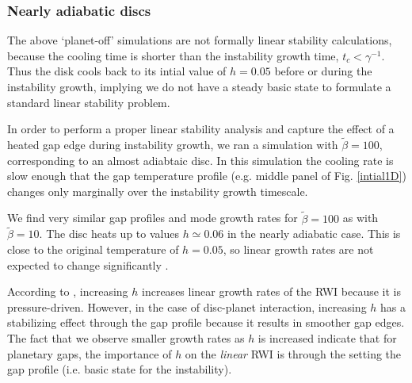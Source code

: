 \subsubsection{Nearly adiabatic discs}
\label{adiabatic_section}
The above `planet-off' simulations are not formally linear
stability calculations, because the cooling time is shorter
than the instability growth time, 
%
$t_c<\gamma^{-1}$.  
Thus the disk cools back to its intial value of $h=0.05$
before or during the instability growth, implying we do not have a
steady basic state to formulate a standard linear stability
problem. %

In order to perform a proper linear stability analysis and capture the
effect of a heated gap edge during instability growth, we ran a simulation  with
$\tilde{\beta}=100$, corresponding to an almost adiabtaic disc.  
In this simulation the cooling rate is slow enough that the gap 
temperature profile (e.g. middle panel of Fig. \ref{intial1D}) changes
only marginally over the instability growth timescale. %

We find very similar gap profiles and mode growth rates for
$\tilde{\beta}=100$ as with $\tilde{\beta}=10$. The disc heats up to
values $h\simeq0.06$ in the nearly adiabatic case. This is close to
the original temperature of $h=0.05$, so linear growth rates are not expected
to change significantly %
\citep{li00}. 

According to \cite{li00}, increasing $h$ increases linear growth rates
of the RWI because it is pressure-driven. However, in the case 
of disc-planet interaction, increasing $h$ has a stabilizing effect
through the gap profile because it results in smoother gap
edges. The fact that we observe smaller growth rates as $h$ is
increased indicate that for planetary gaps, the importance of $h$ on
the \emph{linear} RWI is through the setting the gap profile (i.e. basic
state for the instability). 



